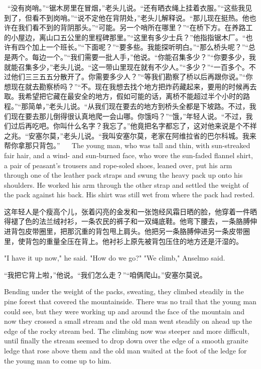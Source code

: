 {	  “没有岗哨。”“锯木房里在冒烟，”老头儿说。“还有晒衣绳上挂着衣服。”“这些我见到了，但看不到岗哨。”“说不定他在背阴处，”老头儿解释说。“那儿现在挺热。他也许在我们看不到的背阴那头。”“可能。另一个哨所在哪里？”“在桥下方。在养路工的小屋边，离山口五公里的里程碑那里。”“这里有多少士兵？”他指指锯木厂。“也许有四个加上一个班长。”“下面呢？”“要多些。我能探听明白。”“那么桥头呢？”“总是两个。每边一个。”“我们需要一批人手，”他说。“你能召集多少？”“你要多少，我就能召集多少，”老头儿说。“这一带山里现在就有不少人。”“多少？”“一百多个。不过他们三三五五分散开了。你需要多少人？”“等我们勘察了桥以后再跟你说。”“你想现在就去勘察桥吗？”“不。现在我想去找个地方把炸药藏起来，要用的时候再去取。我希望把它藏在最安全的地方，假如可能的话，离桥不能超过半个小时的路程。”“那简单，”老头儿说。“从我们现在要去的地方到桥头全都是下坡路。不过，我们现在要去那儿倒得很认真地爬一会山哪。你饿吗？”“饿，”年轻人说。“不过，我们过后再吃吧。你叫什么名字？我忘了。”他竟把名字都忘了，这对他来说是个不祥之兆。“安塞尔莫，”老头儿说。“我叫安塞尔莫，老家在阿维拉省的巴尔科城。我来帮你拿那只背包。” 
	  
	The young man, who was tall and thin, with sun-streaked fair hair, and a wind- and sun-burned face, who wore the sun-faded flannel shirt, a pair of peasant's trousers and rope-soled shoes, leaned over, put his arm through one of the leather pack straps and swung the heavy pack up onto his shoulders. He worked his arm through the other strap and settled the weight of the pack against his back. His shirt was still wet from where the pack had rested.
	
	这年轻人是个瘦高个儿，张着闪亮的金发和一张饱经风霜日晒的脸，他穿着一件晒得褪了色的法兰绒衬衫，一条农民的裤子和一双绳底鞋。他弯下腰去，一条胳膊伸进背包皮带圈里，把那沉重的背包甩上肩头。他把另一条胳膊伸进另一条皮带圈里，使背包的重量全压在背上。他衬衫上原先被背包压住的地方还是汗湿的。 
	
	"I have it up now," he said. "How do we go?" "We climb," Anselmo said.
	
	“我把它背上啦，”他说。“我们怎么走？”“咱俩爬山。”安塞尔莫说。
	
	Bending under the weight of the packs, sweating, they climbed steadily in the pine forest that covered the mountainside. There was no trail that the young man could see, but they were working up and around the face of the mountain and now they crossed a small stream and the old man went steadily on ahead up the edge of the rocky stream bed. The climbing now was steeper and more difficult, until finally the stream seemed to drop down over the edge of a smooth granite ledge that rose above them and the old man waited at the foot of the ledge for the young man to come up to him.
	
}

